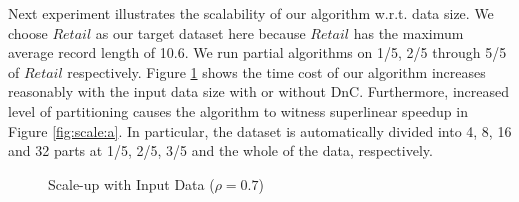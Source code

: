 Next experiment illustrates the scalability of our algorithm
w.r.t. data size. We choose $Retail$ as our target dataset here
because $Retail$ has the maximum average record length of 10.6.
We run partial algorithms on 1/5, 2/5 through 5/5 of $Retail$ respectively.
Figure \ref{fig:scale} shows
the time cost of our algorithm increases reasonably with the
input data size with or without DnC.
Furthermore, increased level of partitioning causes the algorithm to witness
superlinear speedup in Figure \ref{fig:scale:a}. In particular, the dataset is
automatically divided into 4, 8, 16 and 32 parts at 1/5, 2/5, 3/5 and
the whole of the data, respectively.
\begin{figure}[tb]
\centering
{}
\caption{Scale-up with Input Data ($\rho=0.7$)}\label{fig:scale}
\end{figure}

